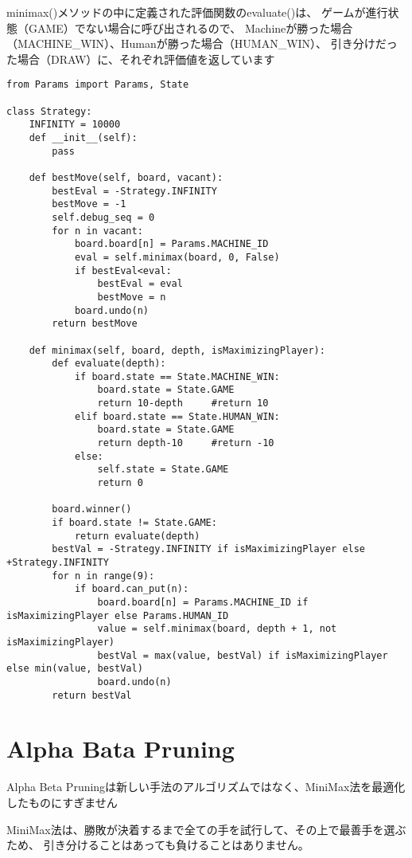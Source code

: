 \documentclass[uplatex,a4paper,11pt,oneside,openany]{jsbook}
\begin{document}
minimax()メソッドの中に定義された評価関数のevaluate()は、
ゲームが進行状態（GAME）でない場合に呼び出されるので、
Machineが勝った場合（MACHINE\_WIN）、Humanが勝った場合（HUMAN\_WIN）、
引き分けだった場合（DRAW）に、それぞれ評価値を返しています


\begin{lstlisting}[caption=Strategy.py,label=minimax07]
from Params import Params, State

class Strategy:
    INFINITY = 10000
    def __init__(self):
        pass

    def bestMove(self, board, vacant):
        bestEval = -Strategy.INFINITY
        bestMove = -1
        self.debug_seq = 0
        for n in vacant:
            board.board[n] = Params.MACHINE_ID
            eval = self.minimax(board, 0, False)
            if bestEval<eval:
                bestEval = eval
                bestMove = n
            board.undo(n)
        return bestMove

    def minimax(self, board, depth, isMaximizingPlayer):
        def evaluate(depth):
            if board.state == State.MACHINE_WIN:
                board.state = State.GAME
                return 10-depth     #return 10
            elif board.state == State.HUMAN_WIN:
                board.state = State.GAME
                return depth-10     #return -10
            else:
                self.state = State.GAME
                return 0

        board.winner()
        if board.state != State.GAME:
            return evaluate(depth)
        bestVal = -Strategy.INFINITY if isMaximizingPlayer else +Strategy.INFINITY
        for n in range(9):
            if board.can_put(n):
                board.board[n] = Params.MACHINE_ID if isMaximizingPlayer else Params.HUMAN_ID
                value = self.minimax(board, depth + 1, not isMaximizingPlayer)
                bestVal = max(value, bestVal) if isMaximizingPlayer else min(value, bestVal)
                board.undo(n)
        return bestVal
\end{lstlisting}

\section{Alpha Bata Pruning}

Alpha Beta Pruningは新しい手法のアルゴリズムではなく、MiniMax法を最適化したものにすぎません

MiniMax法は、勝敗が決着するまで全ての手を試行して、その上で最善手を選ぶため、
引き分けることはあっても負けることはありません。
\end{document}
